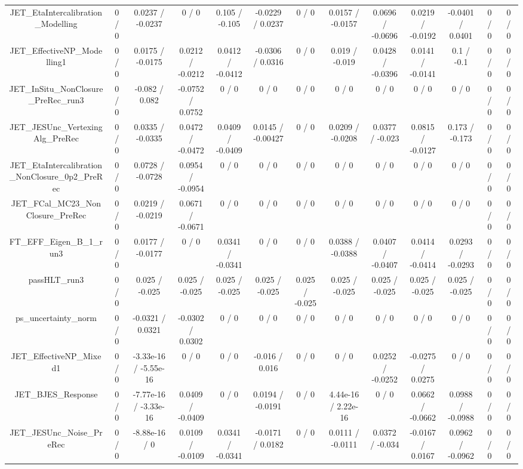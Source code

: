 \documentclass[10pt]{article}
\begin{document}
\begin{table}[htbp]
\begin{center}
\begin{tabular}{|c|c|c|c|c|c|c|c|c|c|c|c|c|}
  JET_EtaIntercalibration_Modelling & 0 / 0 & 0.0237 / -0.0237 & 0 / 0 & 0.105 / -0.105 & -0.0229 / 0.0237 & 0 / 0 & 0.0157 / -0.0157 & 0.0696 / -0.0696 & 0.0219 / -0.0192 & -0.0401 / 0.0401 & 0 / 0 & 0 / 0 \\ 
  JET_EffectiveNP_Modelling1 & 0 / 0 & 0.0175 / -0.0175 & 0.0212 / -0.0212 & 0.0412 / -0.0412 & -0.0306 / 0.0316 & 0 / 0 & 0.019 / -0.019 & 0.0428 / -0.0396 & 0.0141 / -0.0141 & 0.1 / -0.1 & 0 / 0 & 0 / 0 \\ 
  JET_InSitu_NonClosure_PreRec_run3 & 0 / 0 & -0.082 / 0.082 & -0.0752 / 0.0752 & 0 / 0 & 0 / 0 & 0 / 0 & 0 / 0 & 0 / 0 & 0 / 0 & 0 / 0 & 0 / 0 & 0 / 0 \\ 
  JET_JESUnc_VertexingAlg_PreRec & 0 / 0 & 0.0335 / -0.0335 & 0.0472 / -0.0472 & 0.0409 / -0.0409 & 0.0145 / -0.00427 & 0 / 0 & 0.0209 / -0.0208 & 0.0377 / -0.023 & 0.0815 / -0.0127 & 0.173 / -0.173 & 0 / 0 & 0 / 0 \\ 
  JET_EtaIntercalibration_NonClosure_0p2_PreRec & 0 / 0 & 0.0728 / -0.0728 & 0.0954 / -0.0954 & 0 / 0 & 0 / 0 & 0 / 0 & 0 / 0 & 0 / 0 & 0 / 0 & 0 / 0 & 0 / 0 & 0 / 0 \\ 
  JET_FCal_MC23_NonClosure_PreRec & 0 / 0 & 0.0219 / -0.0219 & 0.0671 / -0.0671 & 0 / 0 & 0 / 0 & 0 / 0 & 0 / 0 & 0 / 0 & 0 / 0 & 0 / 0 & 0 / 0 & 0 / 0 \\ 
  FT_EFF_Eigen_B_1_run3 & 0 / 0 & 0.0177 / -0.0177 & 0 / 0 & 0.0341 / -0.0341 & 0 / 0 & 0 / 0 & 0.0388 / -0.0388 & 0.0407 / -0.0407 & 0.0414 / -0.0414 & 0.0293 / -0.0293 & 0 / 0 & 0 / 0 \\ 
  passHLT_run3 & 0 / 0 & 0.025 / -0.025 & 0.025 / -0.025 & 0.025 / -0.025 & 0.025 / -0.025 & 0.025 / -0.025 & 0.025 / -0.025 & 0.025 / -0.025 & 0.025 / -0.025 & 0.025 / -0.025 & 0 / 0 & 0 / 0 \\ 
  ps_uncertainty_norm & 0 / 0 & -0.0321 / 0.0321 & -0.0302 / 0.0302 & 0 / 0 & 0 / 0 & 0 / 0 & 0 / 0 & 0 / 0 & 0 / 0 & 0 / 0 & 0 / 0 & 0 / 0 \\ 
  JET_EffectiveNP_Mixed1 & 0 / 0 & -3.33e-16 / -5.55e-16 & 0 / 0 & 0 / 0 & -0.016 / 0.016 & 0 / 0 & 0 / 0 & 0.0252 / -0.0252 & -0.0275 / 0.0275 & 0 / 0 & 0 / 0 & 0 / 0 \\ 
  JET_BJES_Response & 0 / 0 & -7.77e-16 / -3.33e-16 & 0.0409 / -0.0409 & 0 / 0 & 0.0194 / -0.0191 & 0 / 0 & 4.44e-16 / 2.22e-16 & 0 / 0 & 0.0662 / -0.0662 & 0.0988 / -0.0988 & 0 / 0 & 0 / 0 \\ 
  JET_JESUnc_Noise_PreRec & 0 / 0 & -8.88e-16 / 0 & 0.0109 / -0.0109 & 0.0341 / -0.0341 & -0.0171 / 0.0182 & 0 / 0 & 0.0111 / -0.0111 & 0.0372 / -0.034 & -0.0167 / 0.0167 & 0.0962 / -0.0962 & 0 / 0 & 0 / 0 \\ 

\end{tabular}
\end{center}
\end{table}
\end{document}
